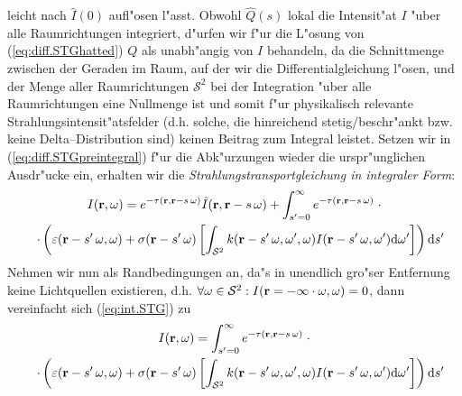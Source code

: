 	leicht nach ${\hat I}(0)$ aufl"osen l"asst. Obwohl ${\hat Q}(s)$ lokal die Intensit"at $I$ "uber alle Raumrichtungen integriert, d"urfen wir f"ur die L"osung von (\ref{eq:diff.STGhatted}) $Q$ als unabh"angig von $I$ behandeln, da die Schnittmenge zwischen der Geraden im Raum, auf der wir die Differentialgleichung l"osen, und der Menge aller Raumrichtungen $\mathcal{S}^2$ bei der Integration "uber alle Raumrichtungen eine Nullmenge ist und somit f"ur physikalisch relevante Strahlungsintensit"atsfelder (d.h. solche, die hinreichend stetig/beschr"ankt bzw. keine Delta--Distribution sind) keinen Beitrag zum Integral leistet.
	Setzen wir in (\ref{eq:diff.STGpreintegral}) f"ur die Abk"urzungen wieder die urspr"unglichen Ausdr"ucke ein, erhalten wir die {\em Strahlungstransportgleichung in integraler Form}:
	\begin{multline}
		I(\mathbf{r},\omega) = e^{-\tau(\mathbf{r},\mathbf{r}-s\,\omega)} {\hat I}(\mathbf{r},\mathbf{r}-s\,\omega) + \int_{s'=0}^\infty e^{-\tau(\mathbf{r},\mathbf{r}-s\,\omega)} \;\cdot \\
		\quad\cdot\left( \varepsilon(\mathbf{r}-s'\,\omega,\omega) + \sigma(\mathbf{r}-s'\,\omega)
		\left[ \int_{\mathcal{S}^2} k(\mathbf{r}-s'\,\omega,\omega',\omega)I(\mathbf{r}-s'\,\omega,\omega') \text{d}\omega'\right] \right) \text{d}s'
		\label{eq:int.STG}
	\end{multline}
	Nehmen wir nun als Randbedingungen an, da"s in unendlich gro"ser Entfernung keine Lichtquellen existieren, d.h. $\forall \omega \in \mathcal{S}^2 : I(\mathbf{r}=-\infty\cdot\omega,\omega)=0$, dann vereinfacht sich (\ref{eq:int.STG}) zu
	\begin{multline}
		I(\mathbf{r},\omega) = \int_{s'=0}^\infty e^{-\tau(\mathbf{r},\mathbf{r}-s\,\omega)} \;\cdot \\
		\quad\cdot\left( \varepsilon(\mathbf{r}-s'\,\omega,\omega) + \sigma(\mathbf{r}-s'\,\omega)
		\left[ \int_{\mathcal{S}^2} k(\mathbf{r}-s'\,\omega,\omega',\omega)I(\mathbf{r}-s'\,\omega,\omega') \text{d}\omega'\right] \right) \text{d}s'
		\label{eq:int.STGdarkbg}
	\end{multline}


